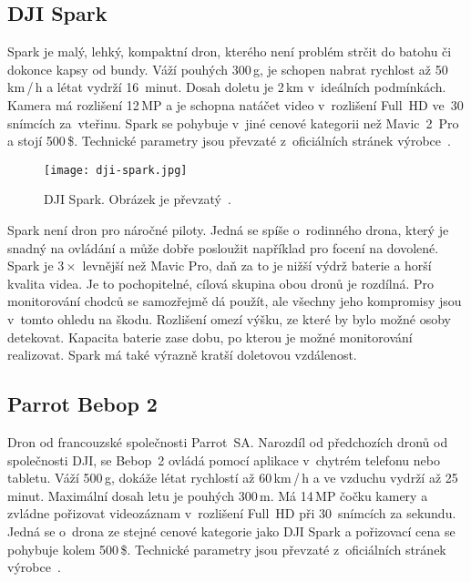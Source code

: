
\pagebreak

\subsection*{DJI Spark}

Spark je malý, lehký, kompaktní dron, kterého není problém strčit do batohu či dokonce kapsy od bundy. Váží pouhých 300\,g, je schopen nabrat rychlost až 50\,km\,/\,h a létat vydrží 16~minut. Dosah doletu je 2\,km v~ideálních podmínkách. Kamera má rozlišení 12\,MP a je schopna natáčet video v~rozlišení Full~HD ve~30 snímcích za~vteřinu. Spark se pohybuje v~jiné cenové kategorii než Mavic~2~Pro a stojí 500\,\$. Technické parametry jsou převzaté z~oficiálních stránek výrobce~\cite{specsSpark}.

\begin{figure}[H]
    \centering
    \texttt{[image: dji-spark.jpg]}
    \caption[DJI Spark]{DJI Spark. Obrázek je převzatý~\cite{specsSpark}.}
    \label{fig_dji-spark}
\end{figure}

Spark není dron pro náročné piloty. Jedná se spíše o~rodinného drona, který je snadný na ovládání a může dobře posloužit například pro focení na dovolené. Spark je $3 \times$ levnější než Mavic Pro, daň za to je nižší výdrž baterie a horší kvalita videa. Je to pochopitelné, cílová skupina obou dronů je rozdílná. Pro monitorování chodců se samozřejmě dá použít, ale všechny jeho kompromisy jsou v~tomto ohledu na škodu. Rozlišení omezí výšku, ze které by bylo možné osoby detekovat. Kapacita baterie zase dobu, po kterou je možné monitorování realizovat. Spark má také výrazně kratší doletovou vzdálenost.


\pagebreak

\subsection*{Parrot Bebop 2}

Dron od francouzské společnosti Parrot~SA. Narozdíl od předchozích dronů od společnosti DJI, se Bebop~2 ovládá pomocí aplikace v~chytrém telefonu nebo tabletu. Váží 500\,g, dokáže létat rychlostí až 60\,km\,/\,h a ve vzduchu vydrží až 25 minut. Maximální dosah letu je pouhých 300\,m. Má 14\,MP čočku kamery a zvládne pořizovat videozáznam v~rozlišení Full~HD při 30~snímcích za sekundu. Jedná se o~drona ze stejné cenové kategorie jako DJI Spark a pořizovací cena se pohybuje kolem 500\,\$. Technické parametry jsou převzaté z~oficiálních stránek výrobce~\cite{specsParrot}.

